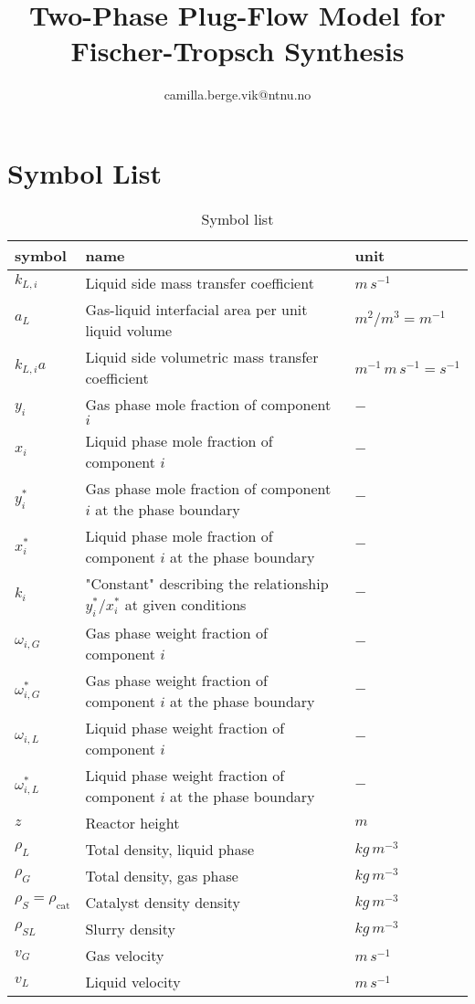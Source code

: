 \documentclass{article}
\author{camilla.berge.vik@ntnu.no}
\title{Two-Phase Plug-Flow Model for Fischer-Tropsch Synthesis}
\begin{document}
\section{Symbol List}
\begin{center}
	\begin{longtable}{lll}
	\caption{Symbol list} \\
	\label{tab:symbol_list}
		\textbf{symbol} & \textbf{name} & \textbf{unit} \\
		\endhead
			$k_{L,i}$ & Liquid side mass transfer coefficient & $m\,s^{-1}$ \\
			$a_L$ & Gas-liquid interfacial area per unit liquid volume & $m^2/m^3= m^{-1}$ \\
			$k_{L,i}a$ & Liquid side volumetric mass transfer coefficient &  $m^{-1}\,m\,s^{-1}=s^{-1}$ \\
			$y_i$ & Gas phase mole fraction of component $i$& $-$ \\
			$x_i$ & Liquid phase mole fraction of component $i$& $-$ \\
			$y_i^*$ & Gas phase mole fraction of component $i$ at the phase boundary & $-$ \\
			$x_i^*$ & Liquid phase mole fraction of component $i$ at the phase boundary & $-$ \\
			$k_i$ & "Constant" describing the relationship $y_i^*/x_i^*$ at {\color{red}given conditions} & $-$ \\
			$\omega_{i,G}$ & Gas phase weight fraction of component $i$& $-$ \\
			$\omega_{i,G}^*$ & Gas phase weight fraction of component $i$ at the phase boundary & $-$ \\
			$\omega_{i,L}$ & Liquid phase weight fraction of component $i$& $-$ \\
			$\omega_{i,L}^*$ & Liquid phase weight fraction of component $i$ at the phase boundary& $-$ \\
			$z$ & Reactor height & $m$ \\
			$\rho_L$ & Total density, liquid phase & $kg\,m^{-3}$ \\
			$\rho_G$ & Total density, gas phase & $kg\,m^{-3}$ \\
			$\rho_S=\rho_{\mathrm{cat}}$ & Catalyst density density & $kg\,m^{-3}$ \\
			$\rho_{SL}$ & Slurry density & $kg\,m^{-3}$ \\
			$v_G$ & Gas velocity & $m\,s^{-1}$\\
			$v_L$ & Liquid velocity & $m\,s^{-1}$\\

\end{longtable}
\end{center}
\end{document}
